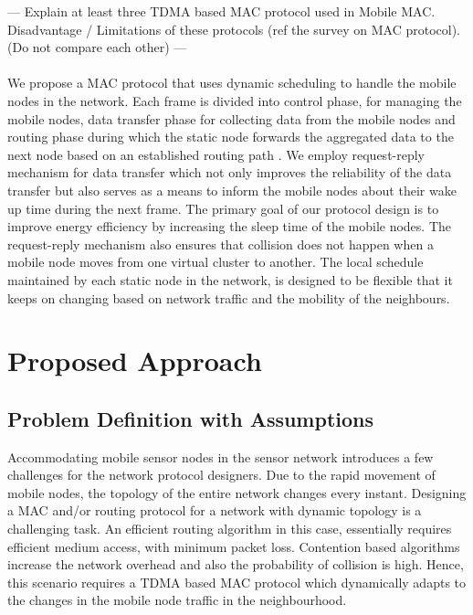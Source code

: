 \documentclass[a4paper, conference, 10pt]{IEEEtran}
\begin{document}

--- Explain at least three TDMA based MAC protocol used in Mobile MAC. Disadvantage / Limitations of these protocols (ref the survey on MAC protocol). (Do not compare each other) ---\\ \\

We propose a MAC protocol that uses dynamic scheduling to handle the mobile nodes in the network. Each frame is divided into control phase, for managing the mobile nodes, data transfer phase for collecting data from the mobile nodes and routing phase during which the static node forwards the aggregated data to the next node based on an established routing path \cite{aodv}. We employ request-reply mechanism for data transfer which not only improves the reliability of the data transfer but also serves as a means to inform the mobile nodes about their wake up time during the next frame. The primary goal of our protocol design is to improve energy efficiency by increasing the sleep time of the mobile nodes. The request-reply mechanism also ensures that collision does not happen when a mobile node moves from one virtual cluster \cite{smac} to another. The local schedule maintained by each static node in the network, is designed to be flexible that it keeps on changing based on network traffic and the mobility of the neighbours.



\section{Proposed Approach}
\subsection*{Problem Definition with Assumptions}
\label{prob_def}
Accommodating mobile sensor nodes in the sensor network introduces a few challenges for the network protocol designers. Due to the rapid movement of mobile nodes, the topology of the entire network changes every instant. Designing a MAC and/or routing protocol for a network with dynamic topology is a challenging task. An efficient routing algorithm in this case, essentially requires efficient medium access, with minimum packet loss. Contention based algorithms increase the network overhead and also the probability of collision is high. Hence, this scenario requires a TDMA based MAC protocol which dynamically adapts to the changes in the mobile node traffic in the neighbourhood.  \\%
\end{document}
